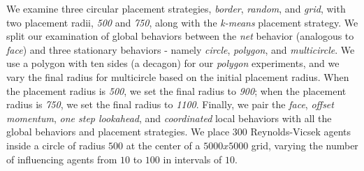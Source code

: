 We examine three circular placement strategies, \textit{border}, \textit{random},
and \textit{grid}, with two placement radii, \textit{500} and \textit{750}, along
with the \textit{k-means} placement strategy.
We split our examination of global behaviors between the \textit{net} behavior
(analogous to \textit{face}) and three stationary behaviors - namely
\textit{circle}, \textit{polygon}, and \textit{multicircle}.
We use a polygon with ten sides (a decagon) for our \textit{polygon} experiments,
and we vary the final radius for multicircle based on the initial placement
radius.
When the placement radius is \textit{500}, we set the final radius to
\textit{900}; when the placement radius is \textit{750}, we set the final radius
to \textit{1100}.
Finally, we pair the \textit{face}, \textit{offset momentum}, \textit{one step
lookahead}, and \textit{coordinated} local behaviors with all the global behaviors
and placement strategies.
We place $300$ Reynolds-Vicsek agents inside a circle of radius $500$ at the center
of a $5000x5000$ grid, varying the number of influencing agents from $10$ to $100$
in intervals of $10$.

